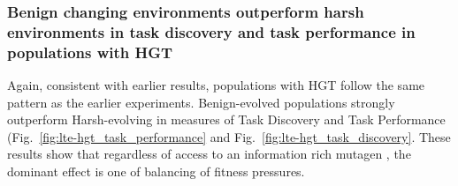 \documentclass[PhD]{msu-thesis}
\begin{document}
\subsubsection{Benign changing environments outperform harsh environments in task discovery and task performance in populations with HGT}
Again, 
consistent with earlier results, populations with HGT follow the same pattern as the earlier experiments. 
Benign-evolved populations strongly outperform Harsh-evolving in measures of Task Discovery and Task Performance (Fig.~\ref{fig:lte-hgt_task_performance} and Fig.~\ref{fig:lte-hgt_task_discovery}. These results show that regardless of access to an information rich mutagen
, the dominant effect
is one of balancing of fitness pressures. 

\end{document}
